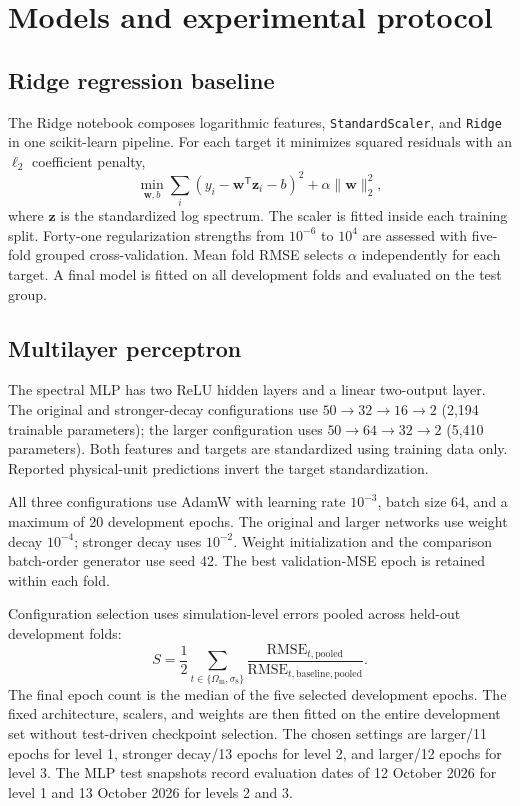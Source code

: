 \documentclass[11pt,a4paper]{article}
\newcommand{\Om}{\Omega_{\mathrm m}}
\newcommand{\sig}{\sigma_8}
\begin{document}
\section{Models and experimental protocol}
\subsection{Ridge regression baseline}
The Ridge notebook composes logarithmic features, \texttt{StandardScaler}, and \texttt{Ridge} in one scikit-learn pipeline. For each target it minimizes squared residuals with an $\ell_2$ coefficient penalty,
\begin{equation}
\min_{\mathbf w,b}\sum_i(y_i-\mathbf w^\mathsf T\mathbf z_i-b)^2+\alpha\|\mathbf w\|_2^2,
\end{equation}
where $\mathbf z$ is the standardized log spectrum. The scaler is fitted inside each training split. Forty-one regularization strengths from $10^{-6}$ to $10^4$ are assessed with five-fold grouped cross-validation. Mean fold RMSE selects $\alpha$ independently for each target. A final model is fitted on all development folds and evaluated on the test group.

\subsection{Multilayer perceptron}
The spectral MLP has two ReLU hidden layers and a linear two-output layer. The original and stronger-decay configurations use $50\rightarrow32\rightarrow16\rightarrow2$ (2,194 trainable parameters); the larger configuration uses $50\rightarrow64\rightarrow32\rightarrow2$ (5,410 parameters). Both features and targets are standardized using training data only. Reported physical-unit predictions invert the target standardization.

All three configurations use AdamW with learning rate $10^{-3}$, batch size 64, and a maximum of 20 development epochs. The original and larger networks use weight decay $10^{-4}$; stronger decay uses $10^{-2}$. Weight initialization and the comparison batch-order generator use seed 42. The best validation-MSE epoch is retained within each fold.

Configuration selection uses simulation-level errors pooled across held-out development folds:
\begin{equation}
S=\frac12\sum_{t\in\{\Om,\sig\}}
\frac{\mathrm{RMSE}_{t,\mathrm{pooled}}}{\mathrm{RMSE}_{t,\mathrm{baseline,pooled}}}.
\end{equation}
The final epoch count is the median of the five selected development epochs. The fixed architecture, scalers, and weights are then fitted on the entire development set without test-driven checkpoint selection. The chosen settings are larger/11 epochs for level 1, stronger decay/13 epochs for level 2, and larger/12 epochs for level 3. The MLP test snapshots record evaluation dates of 12 October 2026 for level 1 and 13 October 2026 for levels 2 and 3.
\end{document}
